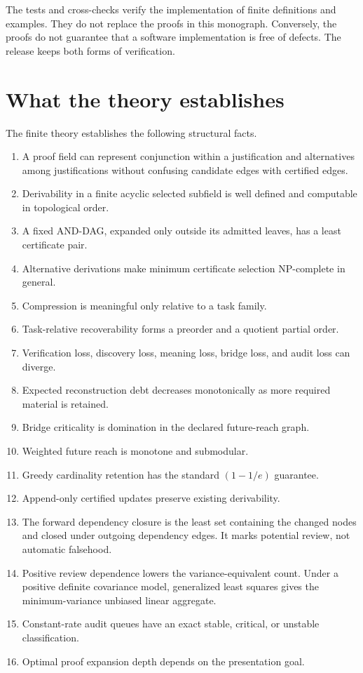 \documentclass[11pt,oneside]{article}
\theoremstyle{komorebiplain}
\theoremstyle{komorebidefinition}
\theoremstyle{komorebiremark}
\begin{document}
The tests and cross-checks verify the implementation of finite definitions and examples. They do not replace the proofs in this monograph. Conversely, the proofs do not guarantee that a software implementation is free of defects. The release keeps both forms of verification.


\section{What the theory establishes}
\label{sec:old26}

The finite theory establishes the following structural facts.

\begin{enumerate}
\item A proof field can represent conjunction within a justification and alternatives among justifications without confusing candidate edges with certified edges.
\item Derivability in a finite acyclic selected subfield is well defined and computable in topological order.
\item A fixed AND-DAG, expanded only outside its admitted leaves, has a least certificate pair.
\item Alternative derivations make minimum certificate selection NP-complete in general.
\item Compression is meaningful only relative to a task family.
\item Task-relative recoverability forms a preorder and a quotient partial order.
\item Verification loss, discovery loss, meaning loss, bridge loss, and audit loss can diverge.
\item Expected reconstruction debt decreases monotonically as more required material is retained.
\item Bridge criticality is domination in the declared future-reach graph.
\item Weighted future reach is monotone and submodular.
\item Greedy cardinality retention has the standard $(1-1/e)$ guarantee.
\item Append-only certified updates preserve existing derivability.
\item The forward dependency closure is the least set containing the changed nodes and closed under outgoing dependency edges. It marks potential review, not automatic falsehood.
\item Positive review dependence lowers the variance-equivalent count. Under a positive definite covariance model, generalized least squares gives the minimum-variance unbiased linear aggregate.
\item Constant-rate audit queues have an exact stable, critical, or unstable classification.
\item Optimal proof expansion depth depends on the presentation goal.
\end{enumerate}
\end{document}
